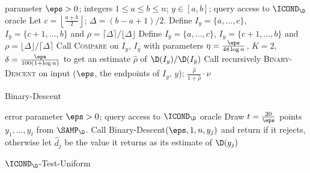 \begin{algorithm}
  \begin{algorithmic}[1]
    \Require parameter $\eps > 0$; integers $1\leq a \leq b \leq n$; $y\in[a,b]$; query access to $\ICOND_\D$ oracle
    \EndIf
    \State Let $c = \left\lfloor\frac{a+b}{2}\right\rfloor$; $\Delta = (b-a+1)/2$.
      \State Define $I_y=\{a,\dots,c\}$, $I_{\bar{y}}=\{c+1,\dots,b\}$ and $\rho = \lceil\Delta\rceil/\lfloor\Delta\rfloor$
    \Else
      \State Define $I_{\bar{y}}=\{a,\dots,c\}$, $I_y=\{c+1,\dots,b\}$ and $\rho = \lfloor\Delta\rfloor/\lceil\Delta\rceil$
    \EndIf
    \State Call \textsc{Compare} on $I_y$, $I_{\bar{y}}$ with parameters $
\eta=\frac{\eps}{48\log n}$, $K=2$, $\delta=\frac{\eps}{100(1 + \log n)}$ to get an estimate $\hat{\rho}$ of $\D(I_y)/\D(I_{\bar{y}})$
      \Return \reject   \label{algo:intcond:uniformity:ub:step:binary:descent:reject}
    \EndIf
    \State Call recursively \textsc{Binary-Descent} on input
     ($\eps$, the endpoints of $I_y$, $y$);
\label{st:do-compare}
      \Return $\frac{\hat{\rho}}{1+\hat{\rho}}\cdot\nu$
    \Else
      \Return \reject
    \EndIf
    \end{algorithmic}\caption{\label{algo:testing-uniformity:icond:binary-descent}\sc Binary-Descent}
\end{algorithm}



\begin{algorithm}
  \begin{algorithmic}[1]
    \Require error parameter $\eps > 0$; query access to $\ICOND_\D$ oracle
    \State Draw $t=\frac{20}{\eps}$ points $y_1,\dots,y_t$ from $\SAMP_\D$. \label{algo:intcond:uniformity:ub:sampling}
       \State Call {\sc Binary-Descent}$(\eps,1,n,y_j)$ and return \reject if it rejects,
otherwise let $\hat{d}_j$ be the value it returns as its estimate of $\D(y_j)$
            \Return \reject \label{algo:intcond:uniformity:ub:reject:2}
       \EndIf
    \EndFor
    \Return \accept
  \end{algorithmic}\caption{\label{algo:testing-uniformity:icond}\sc $\ICOND_\D$-Test-Uniform}
\end{algorithm}


